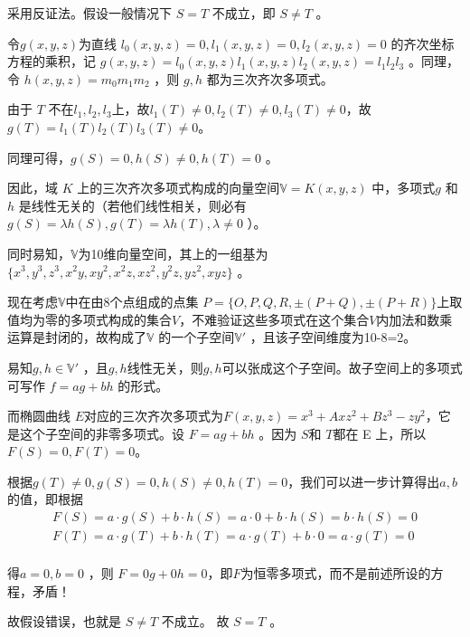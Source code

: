 \documentclass{article}
\begin{document}
采用反证法。假设一般情况下 $S= T$ 不成立，即 $S\ne T$ 。

令$ g(x,y,z) $为直线 $l_0(x,y,z)=0,l_1(x,y,z)=0,l_2(x,y,z)=0$ 的齐次坐标方程的乘积，记 $g(x,y,z)=l_0(x,y,z)l_1(x,y,z)l_2(x,y,z)=l_1l_2l_3$ 。同理，令 $h(x,y,z)=m_0m_1m_2$ ，则 $g,h$ 都为三次齐次多项式。

由于 $T$ 不在$l_1,l_2,l_3$上，故$l_1(T)\ne 0 ,l_2(T)\ne 0 ,l_3(T)\ne 0$，故 $g(T) = l_1(T)l_2(T)l_3(T)\ne 0 $。

同理可得，$g(S)= 0,h(S)\ne 0,h(T)=0$ 。

因此，域 $K$ 上的三次齐次多项式构成的向量空间$ \mathbb{V}=K(x,y,z)$ 中，多项式$ g$  和$ h$ 是线性无关的（若他们线性相关，则必有$ g(S)=\lambda h(S),g(T)=\lambda h(T),\lambda\ne 0 $ ）。

同时易知，$\mathbb{V} $为10维向量空间，其上的一组基为$ \{x^3,y^3,z^3,x^2y,xy^2,x^2z,xz^2,y^2z,yz^2,xyz\}$ 。

现在考虑$ \mathbb{V} $中在由8个点组成的点集 $P = \{ O,P,Q,R,\pm(P+Q),\pm(P+R) \} $上取值均为零的多项式构成的集合$V$，不难验证这些多项式在这个集合$V$内加法和数乘运算是封闭的，故构成了$ \mathbb{V}$
的一个子空间$ \mathbb{V'}$ ，且该子空间维度为10-8=2。

易知$g,h \in \mathbb{V'}$ ，且$g,h$线性无关，则$g,h$可以张成这个子空间。故子空间上的多项式可写作 $f=ag+bh$ 的形式。

而椭圆曲线 $E $对应的三次齐次多项式为$F(x,y,z) = x^3+Axz^2+Bz^3-zy^2 $，它是这个子空间的非零多项式。设 $F=ag+bh$ 。因为 $S $和 $T $都在 E 上，所以$ F(S)=0,F(T)=0 $。

根据$g(T)\ne 0, g(S)= 0,h(S)\ne 0,h(T)=0$，我们可以进一步计算得出$a,b$的值，即根据
\begin{equation}
\begin{split}
F(S)=a\cdot g(S)+b\cdot h(S)=a\cdot 0+b\cdot h(S)=b\cdot h(S)=0\\ 
F(T) = a\cdot g(T)+b\cdot h(T) = a\cdot g(T)+b\cdot 0 = a\cdot g(T) = 0\\ 
\end{split}
\end{equation}


得$ a=0,b=0$ ，则 $F=0g+0h=0 $，即$F$为恒零多项式，而不是前述所设的方程，矛盾！

故假设错误，也就是 $S\ne T$ 不成立。
故 $S=T$ 。
\end{document}
